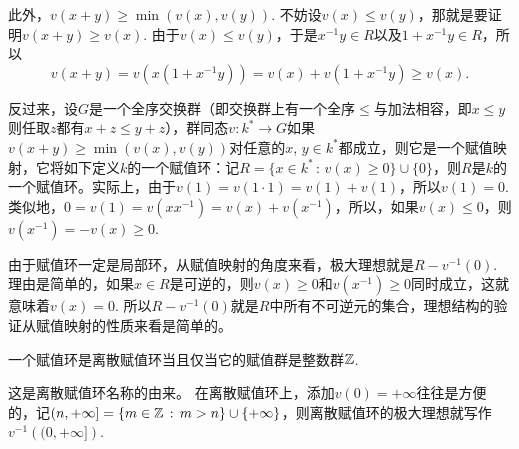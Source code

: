 此外，$v(x+y)\geq \min\left(v(x),v(y)\right)$. 不妨设$v(x)\leq v(y)$，那就是要证明$v(x+y)\geq v(x)$. 由于$v(x)\leq v(y)$，于是$x^{-1}y\in R$以及$1+x^{-1}y\in R$，所以
\[
	v(x+y)=v(x(1+x^{-1}y))=v(x)+v(1+x^{-1}y)\geq v(x).
\]

\para 反过来，设$G$是一个全序交换群（即交换群上有一个全序$\leq$与加法相容，即$x\leq y$则任取$z$都有$x+z\leq y+z$），群同态$v:k^*\to G$如果$v(x+y)\geq \min\left(v(x),v(y)\right)$对任意的$x$, $y\in k^*$都成立，则它是一个赋值映射，它将如下定义$k$的一个赋值环：记$R=\{x\in k^* \,:\, v(x)\geq 0\}\cup \{0\}$，则$R$是$k$的一个赋值环。实际上，由于$v(1)=v(1\cdot 1)=v(1)+v(1)$，所以$v(1)=0$. 类似地，$0=v(1)=v(xx^{-1})=v(x)+v(x^{-1})$，所以，如果$v(x)\leq 0$，则$v(x^{-1})=-v(x)\geq 0$. 

由于赋值环一定是局部环，从赋值映射的角度来看，极大理想就是$R-v^{-1}(0)$. 理由是简单的，如果$x\in R$是可逆的，则$v(x)\geq 0$和$v(x^{-1})\geq 0$同时成立，这就意味着$v(x)=0$. 所以$R-v^{-1}(0)$就是$R$中所有不可逆元的集合，理想结构的验证从赋值映射的性质来看是简单的。

\begin{pro}
一个赋值环是离散赋值环当且仅当它的赋值群是整数群$\mathbb{Z}$. 
\end{pro}

这是离散赋值环名称的由来。
在离散赋值环上，添加$v(0)=+\infty$往往是方便的，记$(n,+\infty]=\{m\in \mathbb{Z}\,:\, m>n\}\cup \{+\infty\}$，则离散赋值环的极大理想就写作$v^{-1}\left((0,+\infty]\right)$. 

